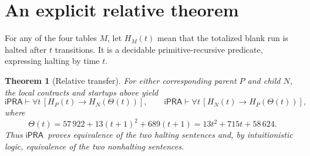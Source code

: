 \documentclass[11pt]{article}
\newcommand{\ipra}{\ensuremath{\mathsf{iPRA}}}
\newtheorem{theorem}{Theorem}
\begin{document}
\section{An explicit relative theorem}
For any of the four tables $M$, let $H_M(t)$ mean that the totalized blank
run is halted after $t$ transitions. It is a decidable primitive-recursive
predicate, expressing halting by time $t$.
\begin{theorem}[Relative transfer]
For either corresponding parent $P$ and child $N$, the local contracts
and startups above yield
\[
 \ipra\vdash\forall t\,[H_P(t)\to H_N(\Theta(t))],\qquad
 \ipra\vdash\forall t\,[H_N(t)\to H_P(\Theta(t))],
\]
where
\[
 \boxed{\Theta(t)=57\,922+13(t+1)^2+689(t+1)
                   =13t^2+715t+58\,624.}
\]
Thus \ipra\ proves equivalence of the two halting sentences and, by
intuitionistic logic, equivalence of the two nonhalting sentences.
\end{theorem}
\end{document}

